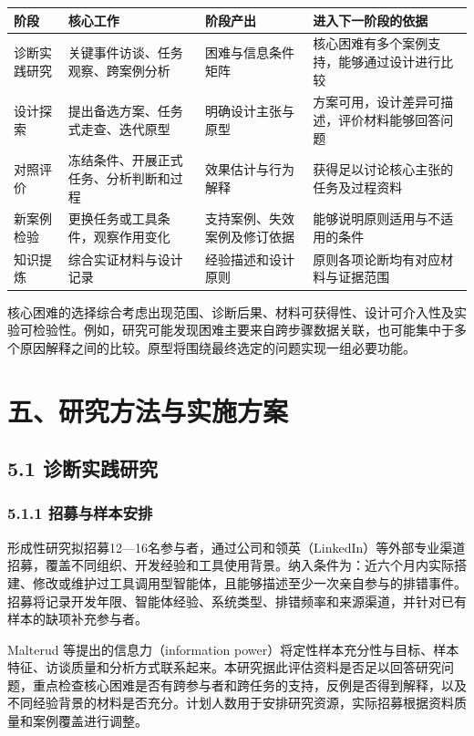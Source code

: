 \begin{table}[H]
  \centering
  \small
  \begin{tabularx}{\textwidth}{Y Y Y Y}
    \toprule
    阶段 & 核心工作 & 阶段产出 & 进入下一阶段的依据 \\
    \midrule
    诊断实践研究 & 关键事件访谈、任务观察、跨案例分析 & 困难与信息条件矩阵 & 核心困难有多个案例支持，能够通过设计进行比较 \\
    设计探索 & 提出备选方案、任务式走查、迭代原型 & 明确设计主张与原型 & 方案可用，设计差异可描述，评价材料能够回答问题 \\
    对照评价 & 冻结条件、开展正式任务、分析判断和过程 & 效果估计与行为解释 & 获得足以讨论核心主张的任务及过程资料 \\
    新案例检验 & 更换任务或工具条件，观察作用变化 & 支持案例、失效案例及修订依据 & 能够说明原则适用与不适用的条件 \\
    知识提炼 & 综合实证材料与设计记录 & 经验描述和设计原则 & 原则各项论断均有对应材料与证据范围 \\
    \bottomrule
  \end{tabularx}
\end{table}

核心困难的选择综合考虑出现范围、诊断后果、材料可获得性、设计可介入性及实验可检验性。例如，研究可能发现困难主要来自跨步骤数据关联，也可能集中于多个原因解释之间的比较。原型将围绕最终选定的问题实现一组必要功能。

\section{五、研究方法与实施方案}

\subsection{5.1 诊断实践研究}

\subsubsection{5.1.1 招募与样本安排}

形成性研究拟招募12—16名参与者，通过公司和领英（LinkedIn）等外部专业渠道招募，覆盖不同组织、开发经验和工具使用背景。纳入条件为：近六个月内实际搭建、修改或维护过工具调用型智能体，且能够描述至少一次亲自参与的排错事件。招募将记录开发年限、智能体经验、系统类型、排错频率和来源渠道，并针对已有样本的缺项补充参与者。

Malterud 等\cite{malterud2016information}提出的信息力（information power）将定性样本充分性与目标、样本特征、访谈质量和分析方式联系起来。本研究据此评估资料是否足以回答研究问题，重点检查核心困难是否有跨参与者和跨任务的支持，反例是否得到解释，以及不同经验背景的材料是否充分。计划人数用于安排研究资源，实际招募根据资料质量和案例覆盖进行调整。


